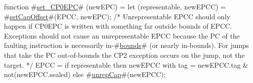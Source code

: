 function #\hyperref[sailMIPSzsetzyCP0EPC]{set\_CP0EPC}# (newEPC) = {
  let (representable, newEPCC) = #\hyperref[sailMIPSzsetCapOffset]{setCapOffset}#(EPCC, newEPC);
  /* Unrepresentable EPCC should only happen if CP0EPC is
    written with something far outside bounds of EPCC. Exceptions should
    not cause an unrepresentable EPCC because the PC of the faulting
    instruction is necessarily in-#\hyperref[sailMIPSzbounds]{bounds}# (or nearly in-bounds). For jumps
    that take the PC out-of-bounds the CP2 exception occurs on the jump,
    not the target. */
  EPCC = if representable then
      {newEPCC with tag = newEPCC.tag & not(newEPCC.sealed)}
    else
      #\hyperref[sailMIPSzunrepCap]{unrepCap}#(newEPCC);
}
